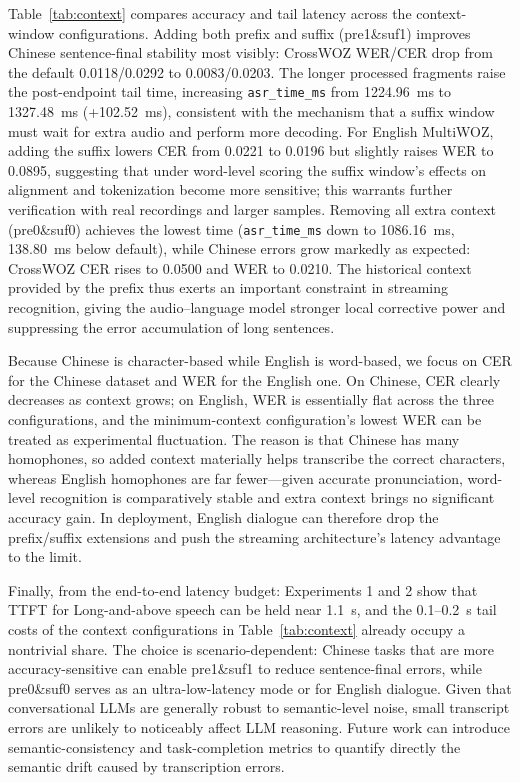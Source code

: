\documentclass[a4paper,11pt]{article}
\begin{document}
Table~\ref{tab:context} compares accuracy and tail latency across the context-window configurations. Adding both prefix and suffix (pre1\&suf1) improves Chinese sentence-final stability most visibly: CrossWOZ WER/CER drop from the default 0.0118/0.0292 to 0.0083/0.0203. The longer processed fragments raise the post-endpoint tail time, increasing \texttt{asr\_time\_ms} from 1224.96~ms to 1327.48~ms (+102.52~ms), consistent with the mechanism that a suffix window must wait for extra audio and perform more decoding. For English MultiWOZ, adding the suffix lowers CER from 0.0221 to 0.0196 but slightly raises WER to 0.0895, suggesting that under word-level scoring the suffix window's effects on alignment and tokenization become more sensitive; this warrants further verification with real recordings and larger samples. Removing all extra context (pre0\&suf0) achieves the lowest time (\texttt{asr\_time\_ms} down to 1086.16~ms, 138.80~ms below default), while Chinese errors grow markedly as expected: CrossWOZ CER rises to 0.0500 and WER to 0.0210. The historical context provided by the prefix thus exerts an important constraint in streaming recognition, giving the audio--language model stronger local corrective power and suppressing the error accumulation of long sentences.

Because Chinese is character-based while English is word-based, we focus on CER for the Chinese dataset and WER for the English one. On Chinese, CER clearly decreases as context grows; on English, WER is essentially flat across the three configurations, and the minimum-context configuration's lowest WER can be treated as experimental fluctuation. The reason is that Chinese has many homophones, so added context materially helps transcribe the correct characters, whereas English homophones are far fewer---given accurate pronunciation, word-level recognition is comparatively stable and extra context brings no significant accuracy gain. In deployment, English dialogue can therefore drop the prefix/suffix extensions and push the streaming architecture's latency advantage to the limit.

Finally, from the end-to-end latency budget: Experiments 1 and 2 show that TTFT for Long-and-above speech can be held near 1.1~s, and the 0.1--0.2~s tail costs of the context configurations in Table~\ref{tab:context} already occupy a nontrivial share. The choice is scenario-dependent: Chinese tasks that are more accuracy-sensitive can enable pre1\&suf1 to reduce sentence-final errors, while pre0\&suf0 serves as an ultra-low-latency mode or for English dialogue. Given that conversational LLMs are generally robust to semantic-level noise, small transcript errors are unlikely to noticeably affect LLM reasoning. Future work can introduce semantic-consistency and task-completion metrics to quantify directly the semantic drift caused by transcription errors.
\end{document}
